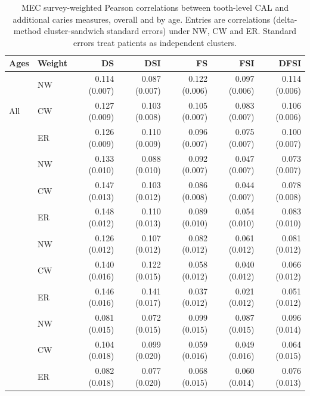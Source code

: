\begin{table}[!t]
\caption{MEC survey-weighted Pearson correlations between tooth-level CAL and additional caries measures, overall and by age. Entries are correlations (delta-method cluster-sandwich standard errors) under NW, CW and ER. Standard errors treat patients as independent clusters.}
\label{tab:supp_nhanes_cal}
\centering\scriptsize\setlength{\tabcolsep}{2pt}
\begin{tabular}{llrrrrr}
\toprule
Ages & Weight & DS & DSI & FS & FSI & DFSI \\
\midrule
\multirow[t]{3}{*}{All} & NW & 0.114 (0.007) & 0.087 (0.007) & 0.122 (0.006) & 0.097 (0.006) & 0.114 (0.006) \\
 & CW & 0.127 (0.009) & 0.103 (0.008) & 0.105 (0.007) & 0.083 (0.007) & 0.106 (0.006) \\
 & ER & 0.126 (0.009) & 0.110 (0.009) & 0.096 (0.007) & 0.075 (0.007) & 0.100 (0.007) \\
\addlinespace[4pt]
\multirow[t]{3}{*}{30--49} & NW & 0.133 (0.010) & 0.088 (0.010) & 0.092 (0.007) & 0.047 (0.007) & 0.073 (0.007) \\
 & CW & 0.147 (0.013) & 0.103 (0.012) & 0.086 (0.008) & 0.044 (0.007) & 0.078 (0.008) \\
 & ER & 0.148 (0.012) & 0.110 (0.013) & 0.089 (0.010) & 0.054 (0.010) & 0.083 (0.010) \\
\addlinespace[4pt]
\multirow[t]{3}{*}{50--64} & NW & 0.126 (0.012) & 0.107 (0.012) & 0.082 (0.012) & 0.061 (0.012) & 0.081 (0.012) \\
 & CW & 0.140 (0.016) & 0.122 (0.015) & 0.058 (0.012) & 0.040 (0.012) & 0.066 (0.012) \\
 & ER & 0.146 (0.016) & 0.141 (0.017) & 0.037 (0.012) & 0.021 (0.012) & 0.051 (0.012) \\
\addlinespace[4pt]
\multirow[t]{3}{*}{$65+$} & NW & 0.081 (0.015) & 0.072 (0.015) & 0.099 (0.015) & 0.087 (0.015) & 0.096 (0.014) \\
 & CW & 0.104 (0.018) & 0.099 (0.020) & 0.059 (0.016) & 0.049 (0.016) & 0.064 (0.015) \\
 & ER & 0.082 (0.018) & 0.077 (0.020) & 0.068 (0.015) & 0.060 (0.014) & 0.076 (0.013) \\
\bottomrule
\end{tabular}
\end{table}
